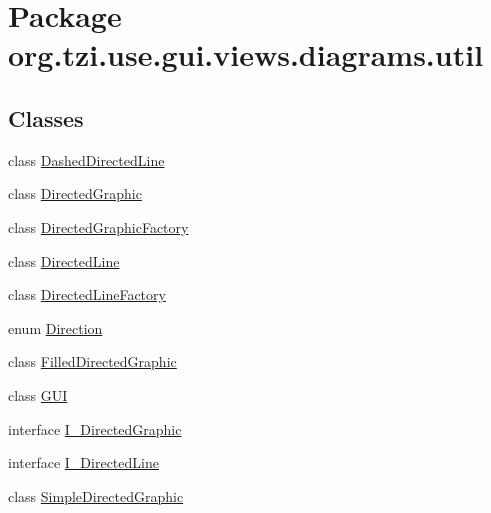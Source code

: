 \hypertarget{namespaceorg_1_1tzi_1_1use_1_1gui_1_1views_1_1diagrams_1_1util}{\section{Package org.\-tzi.\-use.\-gui.\-views.\-diagrams.\-util}
\label{namespaceorg_1_1tzi_1_1use_1_1gui_1_1views_1_1diagrams_1_1util}
}
\subsection*{Classes}
\begin{DoxyCompactItemize}
\item 
class \hyperlink{classorg_1_1tzi_1_1use_1_1gui_1_1views_1_1diagrams_1_1util_1_1_dashed_directed_line}{Dashed\-Directed\-Line}
\item 
class \hyperlink{classorg_1_1tzi_1_1use_1_1gui_1_1views_1_1diagrams_1_1util_1_1_directed_graphic}{Directed\-Graphic}
\item 
class \hyperlink{classorg_1_1tzi_1_1use_1_1gui_1_1views_1_1diagrams_1_1util_1_1_directed_graphic_factory}{Directed\-Graphic\-Factory}
\item 
class \hyperlink{classorg_1_1tzi_1_1use_1_1gui_1_1views_1_1diagrams_1_1util_1_1_directed_line}{Directed\-Line}
\item 
class \hyperlink{classorg_1_1tzi_1_1use_1_1gui_1_1views_1_1diagrams_1_1util_1_1_directed_line_factory}{Directed\-Line\-Factory}
\item 
enum \hyperlink{enumorg_1_1tzi_1_1use_1_1gui_1_1views_1_1diagrams_1_1util_1_1_direction}{Direction}
\item 
class \hyperlink{classorg_1_1tzi_1_1use_1_1gui_1_1views_1_1diagrams_1_1util_1_1_filled_directed_graphic}{Filled\-Directed\-Graphic}
\item 
class \hyperlink{classorg_1_1tzi_1_1use_1_1gui_1_1views_1_1diagrams_1_1util_1_1_g_u_i}{G\-U\-I}
\item 
interface \hyperlink{interfaceorg_1_1tzi_1_1use_1_1gui_1_1views_1_1diagrams_1_1util_1_1_i___directed_graphic}{I\-\_\-\-Directed\-Graphic}
\item 
interface \hyperlink{interfaceorg_1_1tzi_1_1use_1_1gui_1_1views_1_1diagrams_1_1util_1_1_i___directed_line}{I\-\_\-\-Directed\-Line}
\item 
class \hyperlink{classorg_1_1tzi_1_1use_1_1gui_1_1views_1_1diagrams_1_1util_1_1_simple_directed_graphic}{Simple\-Directed\-Graphic}
\item 

\end{DoxyCompactItemize}
